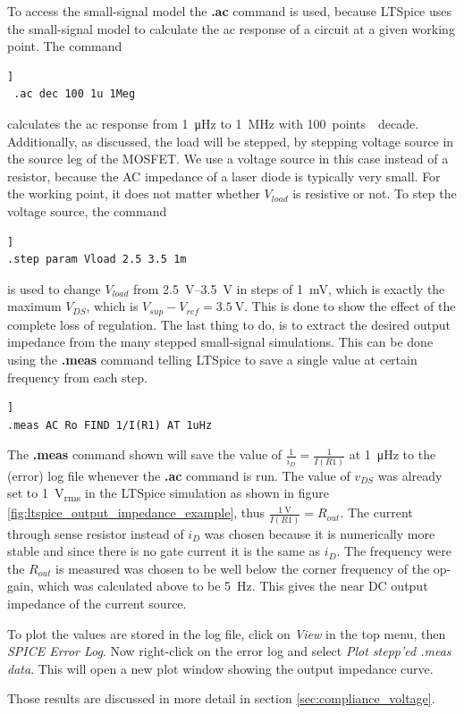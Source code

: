 \documentclass[12pt]{book}
\begin{document}
To access the small-signal model the \textbf{.ac} command is used, because LTSpice uses the small-signal model to calculate the ac response of a circuit at a given working point. The command
\begin{lstlisting}[frame=single, xleftmargin=5mm, xrightmargin=5mm, columns=fullflexible, morekeywords={model, ac, dc, options}, keywordstyle=\bfseries, basicstyle=\rmfamily]]
 .ac dec 100 1u 1Meg
\end{lstlisting}
calculates the ac response from \qty{1}{\micro\hertz} to \qty{1}{\MHz} with \qty{100}{points \per decade}.
Additionally, as discussed, the load will be stepped, by stepping voltage source in the source leg of the MOSFET. We use a voltage source in this case instead of a resistor, because the AC impedance of a laser diode is typically very small. For the working point, it does not matter whether $V_{load}$ is resistive or not. To step the voltage source, the command
\begin{lstlisting}[frame=single, xleftmargin=5mm, xrightmargin=5mm, columns=fullflexible, morekeywords={model, ac, dc, options, step}, keywordstyle=\bfseries, basicstyle=\rmfamily]]
.step param Vload 2.5 3.5 1m
\end{lstlisting}
is used to change $V_{load}$ from \qtyrange{2.5}{3.5}{\V} in steps of \qty{1}{\mV}, which is exactly the maximum $V_{DS}$, which is $V_{sup} - V_{ref} = \qty{3.5}{\V}$. This is done to show the effect of the complete loss of regulation. The last thing to do, is to extract the desired output impedance from the many stepped small-signal simulations. This can be done using the \textbf{.meas} command telling LTSpice to save a single value at certain frequency from each step.
\begin{lstlisting}[frame=single, xleftmargin=5mm, xrightmargin=5mm, columns=fullflexible, morekeywords={model, ac, dc, options, step, meas}, keywordstyle=\bfseries, basicstyle=\rmfamily]]
.meas AC Ro FIND 1/I(R1) AT 1uHz
\end{lstlisting}
The \textbf{.meas} command shown will save the value of $\frac{1}{i_{D}} = \frac{1}{I(R1)}$ at \qty{1}{\micro\hertz} to the (error) log file whenever the \textbf{.ac} command is run. The value of $v_{DS}$ was already set to \qty{1}{\V_{rms}} in the LTSpice simulation as shown in figure \ref{fig:ltspice_output_impedance_example}, thus $\frac{\qty{1}{\V}}{I(R1)} = R_{out}$. The current through sense resistor instead of $i_D$ was chosen because it is numerically more stable and since there is no gate current it is the same as $i_D$. The frequency were the $R_{out}$ is measured was chosen to be well below the corner frequency of the op-gain, which was calculated above to be \qty{5}{\Hz}. This gives the near DC output impedance of the current source.

To plot the values are stored in the log file, click on \textit{View} in the top menu, then \textit{SPICE Error Log}. Now right-click on the error log and select \textit{Plot stepp'ed .meas data}. This will open a new plot window showing the output impedance curve.

Those results are discussed in more detail in section \ref{sec:compliance_voltage}.
\end{document}
